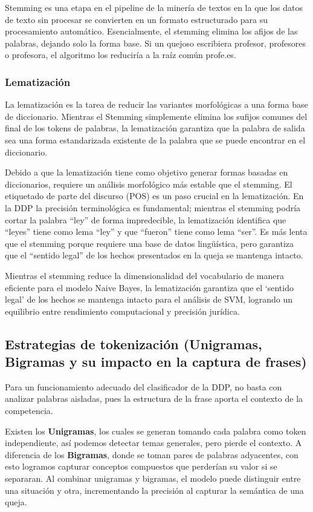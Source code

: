 Stemming es una etapa en el pipeline de la minería de textos en la que los datos de texto sin procesar se convierten en un formato estructurado para su procesamiento automático. Esencialmente, el stemming elimina los afijos de las palabras, dejando solo la forma base. Si un quejoso escribiera profesor, profesores o profesora, el algoritmo los reduciría a la raíz común profe.es.

\subsubsection{Lematización}

La lematización es la tarea de reducir las variantes morfológicas a una forma base de diccionario. Mientras el Stemming simplemente elimina los sufijos comunes del final de los tokens de palabras, la lematización garantiza que la palabra de salida sea una forma estandarizada existente de la palabra que se puede encontrar en el diccionario.

Debido a que la lematización tiene como objetivo generar formas basadas en diccionarios, requiere un análisis morfológico más estable que el stemming. El etiquetado de parte del discurso (POS) es un paso crucial en la lematización. En la DDP la precisión terminológica es fundamental; mientras el stemming podría cortar la palabra “ley” de forma impredecible, la lematización identifica que “leyes” tiene como lema “ley” y que “fueron” tiene como lema “ser”. Es más lenta que el stemming porque requiere una base de datos lingüística, pero garantiza que el “sentido legal” de los hechos presentados en la queja se mantenga intacto.

Mientras el stemming reduce la dimensionalidad del vocabulario de manera eficiente para el modelo Naive Bayes, la lematización garantiza que el ‘sentido legal’ de los hechos se mantenga intacto para el análisis de SVM, logrando un equilibrio entre rendimiento computacional y precisión jurídica.

\subsection{Estrategias de tokenización (Unigramas, Bigramas y su impacto en la captura de frases)}

Para un funcionamiento adecuado del clasificador de la DDP, no basta con analizar palabras aisladas, pues la estructura de la frase aporta el contexto de la competencia.

Existen los \textbf{Unigramas}, los cuales se generan tomando cada palabra como token independiente, así podemos detectar temas generales, pero pierde el contexto. A diferencia de los \textbf{Bigramas}, donde se toman pares de palabras adyacentes, con esto logramos capturar conceptos compuestos que perderían su valor si se separaran. Al combinar unigramas y bigramas, el modelo puede distinguir entre una situación y otra, incrementando la precisión al capturar la semántica de una queja.

